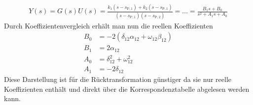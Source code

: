 %
\begin{equation*}
\begin{aligned}
%
Y(s)=G(s)U(s)=\frac{k_{1}\left(s-s_{\text{P},1}\right)+k_{2}\left(s-s_{\text{P},1}\right)}{\left(s-s_{\text{P},1}\right)\left(s-s_{\text{P},2}\right)}=\ldots=\frac{B_{1}s+B_{0}}{s^{2}+A_{1}s+A_{0}}
%
\end{aligned}
\end{equation*}
%
Durch Koeffizientenvergleich erhält man nun die reellen Koeffizienten 
%
\begin{equation*}
\begin{aligned}
%
B_{0}&=-2\left(\delta_{12}\alpha_{12}+\omega_{12}\beta_{12}\right)\\
B_{1}&=2\alpha_{12}\\
A_{0}&=\delta^{2}_{12}+\omega^{2}_{12}\\
A_{1}&=-2\delta_{12}
%
\end{aligned}
\end{equation*}
%
Diese Darstellung ist für die Rücktransformation günstiger da sie nur reelle Koeffizienten enthält und direkt über die Korrespondenztabelle abgelesen werden kann.
%
\newpage
%
